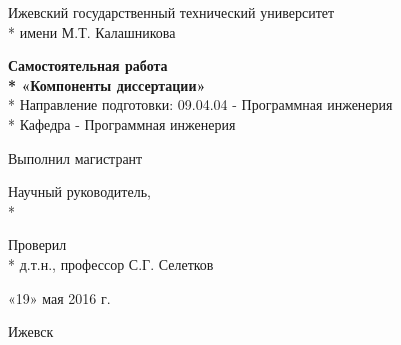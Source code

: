 \begin{titlepage}

\thispagestyle{empty}

\begin{center}
\large
Ижевский государственный технический университет\\*
имени М.Т. Калашникова
\vspace{1cm}
\end{center}

\vspace{8em}

\begin{center}
\large
\textbf{Самостоятельная работа\\*
«Компоненты диссертации»}\\*
Направление подготовки: 09.04.04 - Программная инженерия\\*
Кафедра - Программная инженерия
\end{center}

\vspace{7em}

\begin{flushleft}
Выполнил магистрант \hfill \myname

\vspace{2em}

Научный руководитель,\\*
\myteacherdegree \hfill \myteacher

\vspace{2em}

Проверил\\*
д.т.н., профессор \hfill С.Г. Селетков

\vspace{2em}

\hfill «19» мая 2016 г.
\end{flushleft}

\vspace{\fill}

\begin{center}
    Ижевск \myyear
\end{center}

\end{titlepage}

\setcounter{page}{2}
\pagestyle{plain}
